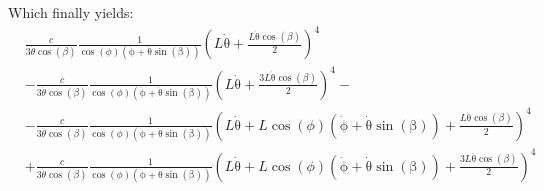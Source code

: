 Which finally yields:
\begin{equation}
    \begin{split}
        &\frac{c}{3\dot\theta\cos(\beta)}\frac{1}{\cos\left(\phi \right)\left(\mathrm{\dot\phi}+\mathrm{\dot\theta\sin(\beta)}\right)}
        \left(L\mathrm{\dot\theta}
        +\frac{L\mathrm{\dot\theta}\cos\left(\beta \right)}{2}\right)^4\\
        &-\frac{c}{3\dot\theta\cos(\beta)}\frac{1}{\cos\left(\phi \right)\left(\mathrm{\dot\phi}+\mathrm{\dot\theta\sin(\beta)}\right)}
        \left(L\mathrm{\dot\theta}+\frac{3L\mathrm{\dot\theta}\cos\left(\beta \right)}{2}\right)^4 -\\%
        &-\frac{c}{3\dot\theta\cos(\beta)}\frac{1}{\cos\left(\phi \right)\left(\mathrm{\dot\phi}+\mathrm{\dot\theta\sin(\beta)}\right)}
        \left(L\mathrm{\dot\theta}+L\cos\left(\phi \right)\left(\mathrm{\dot\phi}+\mathrm{\dot\theta\sin(\beta)}\right)
        +\frac{L\mathrm{\dot\theta}\cos\left(\beta \right)}{2}\right)^4\\
        &+\frac{c}{3\dot\theta\cos(\beta)}\frac{1}{\cos\left(\phi \right)\left(\mathrm{\dot\phi}+\mathrm{\dot\theta\sin(\beta)}\right)}
        \left(L\mathrm{\dot\theta}+L\cos\left(\phi \right)\left(\mathrm{\dot\phi}+\mathrm{\dot\theta\sin(\beta)}\right)+\frac{3L\mathrm{\dot\theta}\cos\left(\beta \right)}{2}\right)^4
    \end{split}
\end{equation}












    


